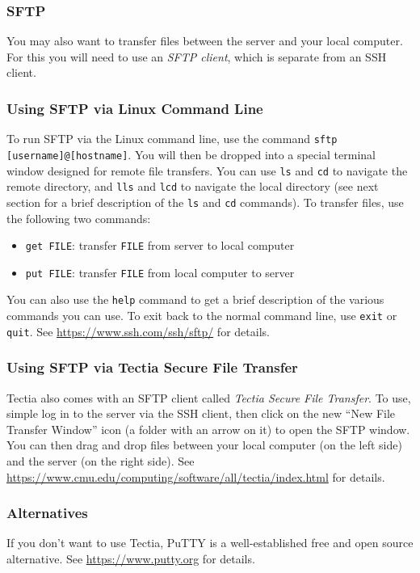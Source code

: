 \documentclass[12pt]{article}
\begin{document}
\subsubsection{SFTP}
You may also want to transfer files between the server and your local computer. For this you will need to use an \emph{SFTP client}, which is separate from an SSH client.

\subsubsection{Using SFTP via Linux Command Line}
To run SFTP via the Linux command line, use the command \texttt{sftp [username]@[hostname]}. You will then be dropped into a special terminal window designed for remote file transfers. You can use \texttt{ls} and \texttt{cd} to navigate the remote directory, and \texttt{lls} and \texttt{lcd} to navigate the local directory (see next section for a brief description of the \texttt{ls} and \texttt{cd} commands). To transfer files, use the following two commands:
\begin{itemize}
    \item \texttt{get FILE}: transfer \texttt{FILE} from server to local computer
    \item \texttt{put FILE}: transfer \texttt{FILE} from local computer to server
\end{itemize}
You can also use the \texttt{help} command to get a brief description of the various commands you can use. To exit back to the normal command line, use \texttt{exit} or \texttt{quit}. See \url{https://www.ssh.com/ssh/sftp/} for details.

\subsubsection{Using SFTP via Tectia Secure File Transfer}
Tectia also comes with an SFTP client called \emph{Tectia Secure File Transfer}. To use, simple log in to the server via the SSH client, then click on the new ``New File Transfer Window'' icon (a folder with an arrow on it) to open the SFTP window. You can then drag and drop files between your local computer (on the left side) and the server (on the right side). See \url{https://www.cmu.edu/computing/software/all/tectia/index.html} for details.

\subsubsection{Alternatives}
If you don't want to use Tectia, PuTTY is a well-established free and open source alternative. See \url{https://www.putty.org} for details.
\end{document}
